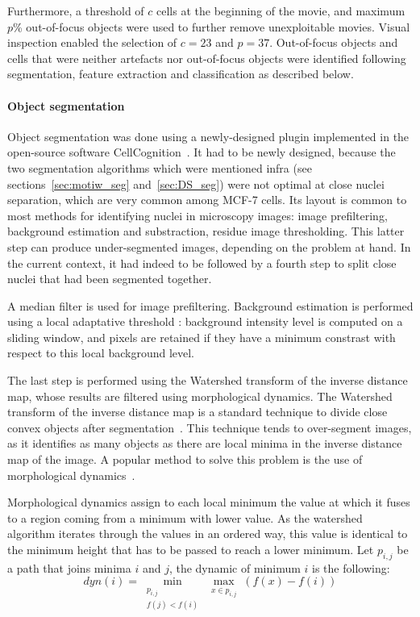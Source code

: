 Furthermore, a threshold of $c$ cells at the beginning of the movie, and maximum $p$\% out-of-focus objects were used to further remove unexploitable movies. Visual inspection enabled the selection of $c=23$ and $p=37$. Out-of-focus objects and cells that were neither artefacts nor out-of-focus objects were identified following segmentation, feature extraction and classification as described below.

\paragraph{Object segmentation}
Object segmentation was done using a newly-designed plugin implemented in the open-source software CellCognition~\cite{cellcognition}. It had to be newly designed, because the two segmentation algorithms which were mentioned infra (see sections~\ref{sec:motiw_seg} and~\ref{sec:DS_seg}) were not optimal at close nuclei separation, which are very common among MCF-7 cells. Its layout is common to most methods for identifying nuclei in microscopy images: image prefiltering, background estimation and substraction, residue image thresholding. This latter step can produce under-segmented images, depending on the problem at hand. In the current context, it had indeed to be followed by a fourth step to split close nuclei that had been segmented together.

A median filter is used for image prefiltering. Background estimation is performed using a local adaptative threshold : background intensity level is computed on a sliding window, and pixels are retained if they have a minimum constrast with respect to this local background level.

The last step is performed using the Watershed transform of the inverse distance map, whose results are filtered using morphological dynamics. The Watershed transform of the inverse distance map is a standard technique to divide close convex objects after segmentation~\cite[Chapter Geodesic segmentation]{lantuejoul}. This technique tends to over-segment images, as it identifies as many objects as there are local minima in the inverse distance map of the image. A popular method to solve this problem is the use of morphological dynamics~\cite{Soille:2003:MIA:773286}.

Morphological dynamics assign to each local minimum the value at which it fuses to a region coming from a minimum with lower value. As the watershed algorithm iterates through the values in an ordered way, this value is identical to the minimum height that has to be passed to reach a lower minimum. Let $p_{i,j}$ be a path that joins minima $i$ and $j$, the dynamic of minimum $i$ is the following:
\[ dyn(i) = \min_{\substack{p_{i,j} \\ f (j)<f (i)}} \max_{\substack{x\in p_{i,j}}} (f(x) - f(i))\]

